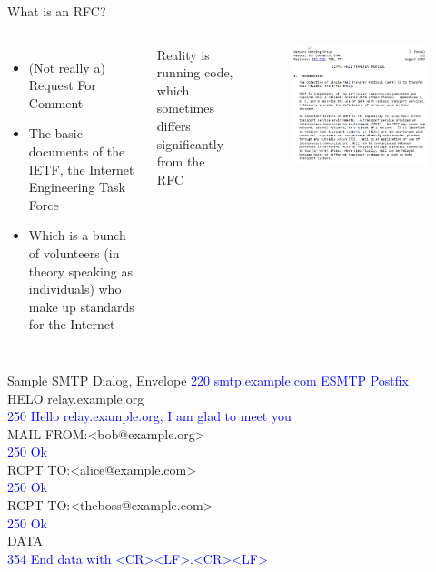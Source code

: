 \documentclass[nobackground,dvipsnames,table]{beamer}
\begin{document}
\begin{frame}{What is an RFC?}
    \begin{columns}
            \begin{itemize}
                \item (Not really a) Request For Comment
                \item The basic documents of the IETF, the Internet Engineering Task Force
                \item Which is a bunch of volunteers (in theory speaking as individuals) who make up standards for the Internet
            \end{itemize}
            Reality is running code, which sometimes differs significantly from the RFC
            \begin{figure}
                \centering
                \includegraphics[width=\textwidth]{SMTP}
            \end{figure}
    \end{columns}
\end{frame}

\begin{frame}{Sample SMTP Dialog, Envelope}
    \textcolor{blue}{220 smtp.example.com ESMTP Postfix\\}
    HELO relay.example.org\\
    \textcolor{blue}{250 Hello relay.example.org, I am glad to meet you\\}
    MAIL FROM:<bob@example.org>\\
    \textcolor{blue}{250 Ok\\}
    RCPT TO:<alice@example.com>\\
    \textcolor{blue}{250 Ok\\}
    RCPT TO:<theboss@example.com>\\
    \textcolor{blue}{250 Ok\\}
    DATA\\
    \textcolor{blue}{354 End data with <CR><LF>.<CR><LF>}
\end{frame}
\end{document}

